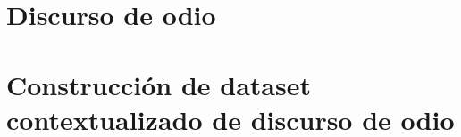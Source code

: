 
\chapter{Discurso de odio}
\label{app:04}


\chapter{Construcción de dataset contextualizado de discurso de odio}
\label{app:05}




